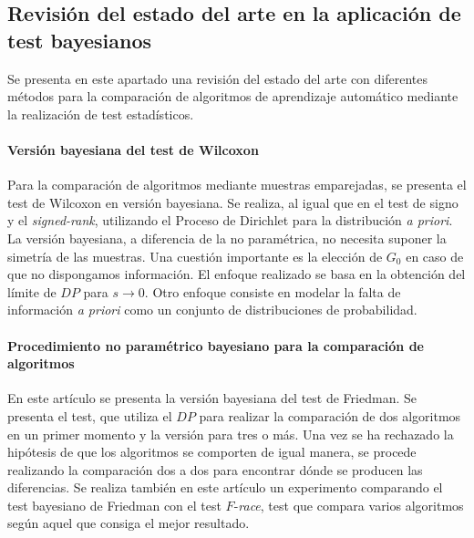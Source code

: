 \subsection{Revisión del estado del arte en la aplicación de test bayesianos}

	Se presenta en este apartado una revisión del estado del 
arte con diferentes métodos para la comparación de algoritmos
de aprendizaje automático mediante la realización de test 
estadísticos. 

\paragraph{Versión bayesiana del test de Wilcoxon} 
\cite{BENAVOLI14} Para la comparación de algoritmos mediante
muestras emparejadas, se presenta el test de Wilcoxon en 
versión bayesiana. Se realiza, al igual que en el test
de signo y el \textit{signed-rank}, utilizando el Proceso de
Dirichlet para la distribución \textit{a priori}. La versión 
bayesiana, a diferencia de la no paramétrica, no necesita 
suponer la simetría de las muestras. Una cuestión importante
es la elección de $G_0$ en caso de que no dispongamos
información. El enfoque realizado se basa en la obtención
del límite de $DP$ para $s \rightarrow 0$. Otro enfoque 
consiste en modelar la falta de información \textit{a priori} 
como un conjunto de distribuciones de probabilidad. 

\paragraph{Procedimiento no paramétrico bayesiano para la 
comparación de algoritmos} \cite{BENAVOLI15a} En este 
artículo se presenta la versión bayesiana del test de 
Friedman. Se presenta el test, que utiliza el $DP$ para 
realizar la comparación de dos algoritmos en un primer
momento y la versión para tres o más. Una vez se ha rechazado 
la hipótesis de que los algoritmos se comporten de igual
manera, se procede realizando la comparación dos a dos 
para encontrar dónde se producen las diferencias. Se realiza 
también en este artículo un experimento comparando el test
bayesiano de Friedman con el test $F$-\textit{race}, test que
compara varios algoritmos según aquel que consiga el mejor
resultado.

